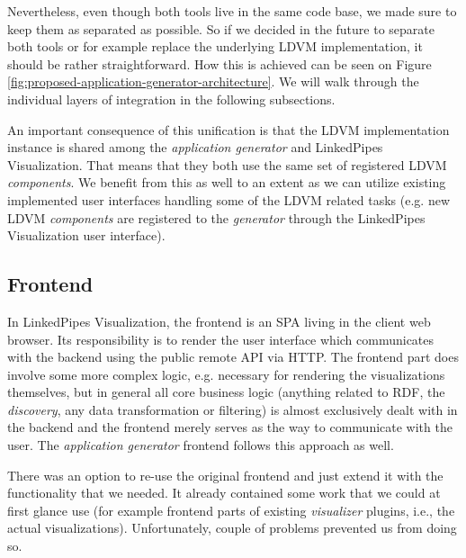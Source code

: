 Nevertheless, even though both tools live in the same code base, we made sure to keep them as separated as possible. So if we decided in the future to separate both tools or for example replace the underlying LDVM implementation, it should be rather straightforward. How this is achieved can be seen on Figure \ref{fig:proposed-application-generator-architecture}. We will walk through the individual layers of integration in the following subsections.

An important consequence of this unification is that the LDVM implementation instance is shared among the \emph{application generator} and LinkedPipes Visualization. That means that they both use the same set of registered LDVM \emph{components}. We benefit from this as well to an extent as we can utilize existing implemented user interfaces handling some of the LDVM related tasks (e.g. new LDVM \emph{components} are registered to the \emph{generator} through the LinkedPipes Visualization user interface).

\subsection{Frontend}

In LinkedPipes Visualization, the frontend is an SPA living in the client web browser. Its responsibility is to render the user interface which communicates with the backend using the public remote API via HTTP. The frontend part does involve some more complex logic, e.g. necessary for rendering the visualizations themselves, but in general all core business logic (anything related to RDF, the \emph{discovery}, any data transformation or filtering) is almost exclusively dealt with in the backend and the frontend merely serves as the way to communicate with the user. The \emph{application generator} frontend follows this approach as well.

There was an option to re-use the original frontend and just extend it with the functionality that we needed. It already contained some work that we could at first glance use (for example frontend parts of existing \emph{visualizer} plugins, i.e., the actual visualizations). Unfortunately, couple of problems prevented us from doing so. 

